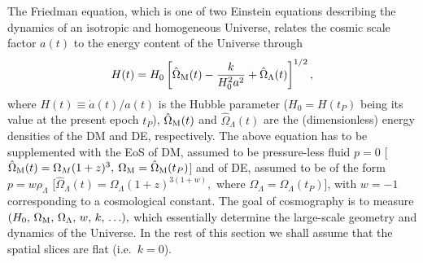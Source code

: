 The Friedman equation, which is one of two Einstein
equations describing the dynamics of an isotropic and homogeneous
Universe, relates the cosmic scale factor $a(t)$ to the energy
content of the Universe through
\begin{equation}
H(t) = H_0 \left [ \hat\Omega_{\rm M}(t) - \frac{k}{H_0^2a^2} +
\hat\Omega_\Lambda(t)  \right ]^{1/2},
\label{eq:friedman_equation}
\end{equation}
where $H(t)\equiv \dot a(t)/a(t)$ is the Hubble parameter
($H_0=H(t_P)$ being its value at the present epoch $t_P$),
$\hat\Omega_{\rm M}(t)$ and $\hat\Omega_\Lambda(t)$ are the (dimensionless)
energy densities of the DM and DE, respectively.
The above equation has to be supplemented with the
EoS of DM, assumed to be pressure-less
fluid $p=0$ [$\hat\Omega_{\rm M}(t)=\Omega_M(1+z)^3,$
$\Omega_{\rm M}=\hat\Omega_{\rm M}(t_P)$]
and of DE, assumed to be of the form
$p = w\rho_{\Lambda}$ [$\hat\Omega_\Lambda(t)=\Omega_\Lambda(1+z)^{3(1+w)},$
where $\Omega_\Lambda=\Omega_\Lambda(t_P)$],
with $w=-1$ corresponding to a cosmological constant.
The goal of cosmography is to measure $(H_0,\,
\Omega_{\rm M},\, \Omega_\Lambda,\, w,\, k,\, \ldots),$
which essentially determine the large-scale geometry and
dynamics of the Universe.  In the rest of this section
we shall assume that the spatial slices are
flat (i.e.\  $k=0$).



